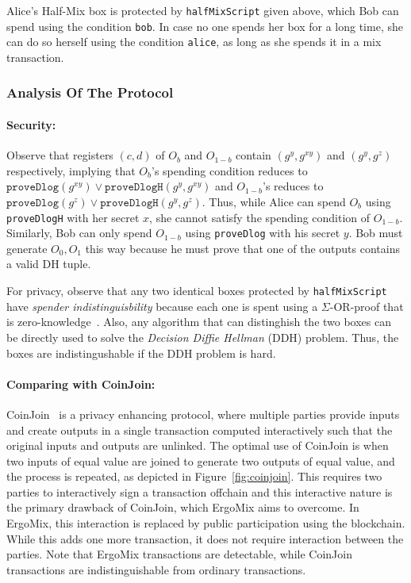 \documentclass[11pt]{article}
\newcommand{\mixname}{ErgoMix\xspace}
\begin{document}
Alice's Half-Mix box is protected by \texttt{halfMixScript} given above, which Bob can spend using the condition \texttt{bob}. In case no one spends her box for a long time, she can do so herself using the condition \texttt{alice}, as long as she spends it in a mix transaction.  

\subsubsection{Analysis Of The Protocol}
\paragraph{Security:} Observe that registers $(c, d)$ of $O_b$ and $O_{1-b}$ contain $(g^y, g^{xy})$ and $(g^y, g^z)$ respectively, implying that $O_b$'s  spending condition reduces to $\texttt{proveDlog}(g^{xy}) \lor \texttt{proveDlogH}(g^y, g^{xy})$ and $O_{1-b}$'s reduces to $\texttt{proveDlog}(g^z) \lor \texttt{proveDlogH}(g^{y}, g^z)$. Thus, while Alice can spend $O_b$ using \texttt{proveDlogH} with her secret $x$, she cannot satisfy the spending condition of $O_{1-b}$. Similarly, Bob can only spend $O_{1-b}$ using \texttt{proveDlog} with his secret $y$. Bob must generate $O_0, O_1$ this way because he must prove that one of the outputs contains a valid DH tuple.

For privacy, observe that any two identical boxes protected by \texttt{halfMixScript} have {\em spender indistinguisbility} because each one is spent using a $\Sigma$-OR-proof that is zero-knowledge~\cite{Dam10}. Also, any algorithm that can distinghish the two boxes can be directly used to solve the {\em Decision Diffie Hellman} (DDH) problem. Thus, the boxes are indistingushable if the DDH problem is hard.

\paragraph{Comparing with CoinJoin:} CoinJoin~\cite{coinjoin} is a privacy enhancing protocol, where multiple parties provide inputs and create outputs in a single transaction computed interactively such that the original inputs and outputs are unlinked. The optimal use of CoinJoin is when two inputs of equal value are joined to generate two outputs of equal value, and the process is repeated, as depicted in Figure~\ref{fig:coinjoin}. 
This requires two parties to interactively sign a transaction offchain and this interactive nature is the primary drawback of CoinJoin, which \mixname aims to overcome. 
In \mixname, this interaction is replaced by public participation using the blockchain. While this adds one more transaction, it does not require interaction between the parties. Note that \mixname transactions are detectable, while CoinJoin transactions are indistinguishable from ordinary transactions. 
\end{document}

